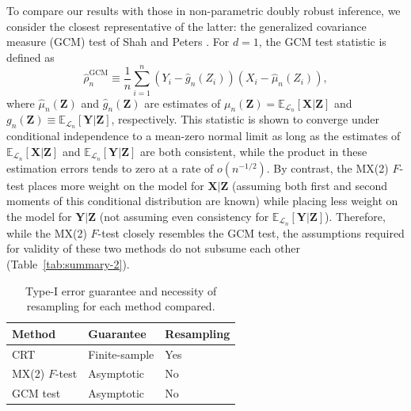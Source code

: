 \documentclass[12pt]{article}
\theoremstyle{definition}
\theoremstyle{remark}
\newcommand{\prx}{\bm X}
\newcommand{\srx}{X}
\newcommand{\prz}{\bm Z}
\newcommand{\srz}{Z}
\newcommand{\pry}{{\bm Y}}
\newcommand{\sry}{Y}
\begin{document}
To compare our results with those in non-parametric doubly robust inference, we consider the closest representative of the latter: the generalized covariance measure (GCM) test of Shah and Peters \cite{Shah2018}. For $d = 1$, the GCM test statistic is defined as
\begin{equation}
	\widehat \rho^{\text{GCM}}_n \equiv \frac{1}{n}\sum_{i = 1}^n  (\sry_i - \widehat g_n(\srz_i))(\srx_i - \widehat \mu_n(\srz_i)),
\end{equation}
where $\widehat \mu_n(\prz)$ and $\widehat g_n(\prz)$ are estimates of $\mu_n(\prz) = \mathbb E_{\mathcal L_n}[\prx|\prz]$ and $g_n(\prz) \equiv \mathbb E_{\mathcal L_n}[\pry|\prz]$, respectively. This statistic is shown to converge under conditional independence to a mean-zero normal limit as long as the estimates of $\mathbb E_{\mathcal L_n}[\prx|\prz]$ and $\mathbb E_{\mathcal L_n}[\pry|\prz]$ are both consistent, while the product in these estimation errors tends to zero at a rate of $o(n^{-1/2})$. By contrast, the MX(2) $F$-test places more weight on the model for $\prx|\prz$ (assuming both first and second moments of this conditional distribution are known) while placing less weight on the model for $\pry|\prz$ (not assuming even consistency for $\mathbb E_{\mathcal L_n}[\pry|\prz]$). Therefore, while the MX(2) $F$-test closely resembles the GCM test, the assumptions required for validity of these two methods do not subsume each other (Table~\ref{tab:summary-2}). 



	\begin{table}[h!]
	\centering
	\begin{tabular}{l|ll}
		Method & Guarantee & Resampling \\
		\hline
		CRT & Finite-sample & Yes \\	
		MX(2) $F$-test & Asymptotic & No  \\
		GCM test & Asymptotic & No
	\end{tabular}
	\caption{Type-I error guarantee and necessity of resampling for each method compared.}
	\label{tab:summary-1}
\end{table}
\end{document}
